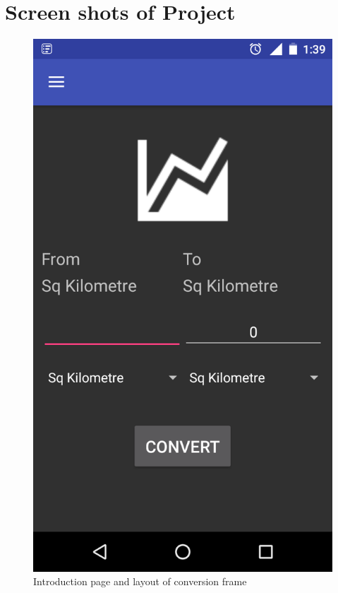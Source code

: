 \documentclass[a4paper, 12pt]{report}
\begin{document}
\section{Screen shots of Project}
\begin{center}
\begin{figure}[h]
\centering
\includegraphics[scale = 0.35]{./ss1}
\caption{Introduction page and layout of conversion frame}
\end{figure}
\end{center}
\end{document}

